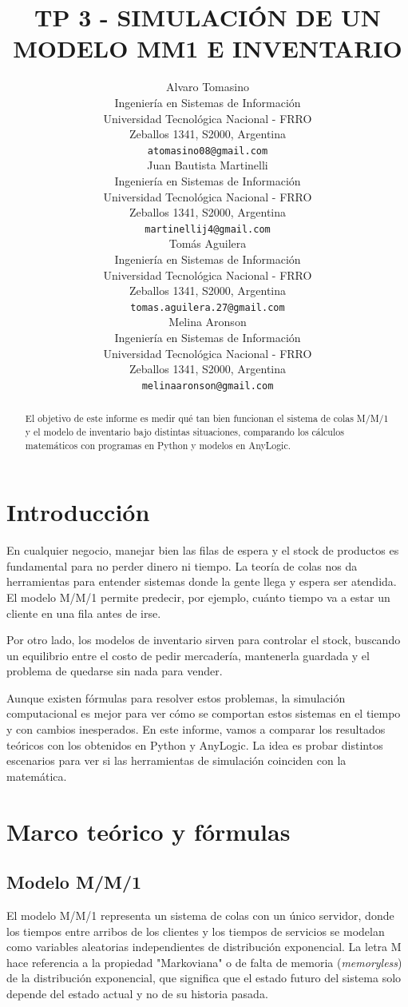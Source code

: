 \documentclass{article}
\title{TP 3 - SIMULACIÓN DE UN MODELO MM1 E INVENTARIO}
\author{
    Alvaro Tomasino \\
    Ingeniería en Sistemas de Información\\
    Universidad Tecnológica Nacional - FRRO\\
    Zeballos 1341, S2000, Argentina\\
    \texttt{atomasino08@gmail.com} \\
\And
    Juan Bautista Martinelli \\
    Ingeniería en Sistemas de Información\\
    Universidad Tecnológica Nacional - FRRO\\
    Zeballos 1341, S2000, Argentina\\
    \texttt{martinellij4@gmail.com} \\
\And
    Tomás Aguilera \\
    Ingeniería en Sistemas de Información\\
    Universidad Tecnológica Nacional - FRRO\\
    Zeballos 1341, S2000, Argentina\\
    \texttt{tomas.aguilera.27@gmail.com} \\
\And
    Melina Aronson \\
    Ingeniería en Sistemas de Información\\
    Universidad Tecnológica Nacional - FRRO\\
    Zeballos 1341, S2000, Argentina\\
    \texttt{melinaaronson@gmail.com} \\
}
\begin{document}
\maketitle




\begin{abstract}
El objetivo de este informe es medir qué tan bien funcionan el sistema de colas M/M/1 y el modelo de inventario bajo distintas situaciones, comparando los cálculos matemáticos con programas en Python y modelos en AnyLogic.
\end{abstract}





\section{Introducción}

En cualquier negocio, manejar bien las filas de espera y el stock de productos es fundamental para no perder dinero ni tiempo. La teoría de colas nos da herramientas para entender sistemas donde la gente llega y espera ser atendida. El modelo M/M/1 permite predecir, por ejemplo, cuánto tiempo va a estar un cliente en una fila antes de irse.

Por otro lado, los modelos de inventario sirven para controlar el stock, buscando un equilibrio entre el costo de pedir mercadería, mantenerla guardada y el problema de quedarse sin nada para vender.

Aunque existen fórmulas para resolver estos problemas, la simulación computacional es mejor para ver cómo se comportan estos sistemas en el tiempo y con cambios inesperados. En este informe, vamos a comparar los resultados teóricos con los obtenidos en Python y AnyLogic. La idea es probar distintos escenarios para ver si las herramientas de simulación coinciden con la matemática.




\section{Marco teórico y fórmulas}
\label{sec:marco}

\subsection{Modelo M/M/1}
El modelo M/M/1 representa un sistema de colas con un único servidor, donde los tiempos entre arribos de los clientes y los tiempos de servicios se modelan como variables aleatorias independientes de distribución exponencial. La letra M hace referencia a la propiedad "Markoviana" o de falta de memoria (\textit{memoryless}) de la distribución exponencial, que significa que el estado futuro del sistema solo depende del estado actual y no de su historia pasada.
\end{document}

